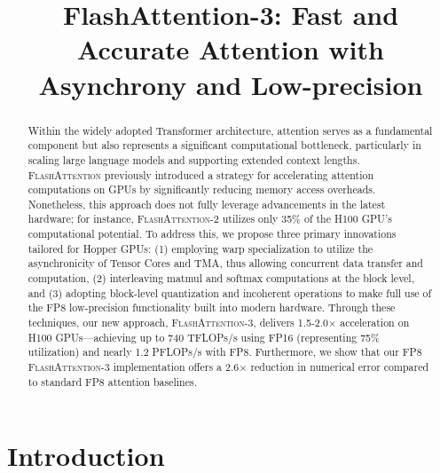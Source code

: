 \title{FlashAttention-3: Fast and Accurate Attention with Asynchrony and Low-precision}

\begin{abstract}
Within the widely adopted Transformer architecture, attention serves as a fundamental component but also represents a significant computational bottleneck, particularly in scaling large language models and supporting extended context lengths. \textsc{FlashAttention} previously introduced a strategy for accelerating attention computations on GPUs by significantly reducing memory access overheads. Nonetheless, this approach does not fully leverage advancements in the latest hardware; for instance, \textsc{FlashAttention-2} utilizes only 35\% of the H100 GPU’s computational potential. To address this, we propose three primary innovations tailored for Hopper GPUs: (1) employing warp specialization to utilize the asynchronicity of Tensor Cores and TMA, thus allowing concurrent data transfer and computation, (2) interleaving matmul and softmax computations at the block level, and (3) adopting block-level quantization and incoherent operations to make full use of the FP8 low-precision functionality built into modern hardware. Through these techniques, our new approach, \textsc{FlashAttention-3}, delivers 1.5-2.0$\times$ acceleration on H100 GPUs—achieving up to 740 TFLOPs/s using FP16 (representing 75\% utilization) and nearly 1.2 PFLOPs/s with FP8. Furthermore, we show that our FP8 \textsc{FlashAttention-3} implementation offers a 2.6$\times$ reduction in numerical error compared to standard FP8 attention baselines.
\end{abstract}

\section{Introduction}
\label{sec:intro}

